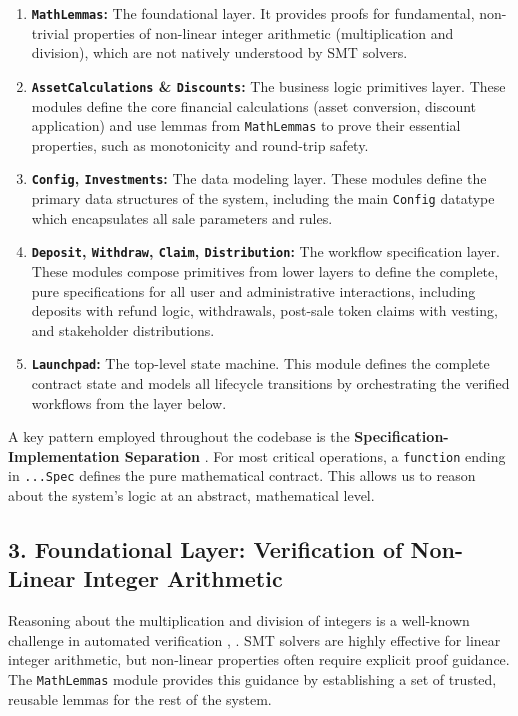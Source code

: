 \documentclass[
  english,
  onecolumn]{article}
\providecommand{\tightlist}{%
  \setlength{\itemsep}{0pt}\setlength{\parskip}{0pt}}
\begin{document}
\begin{enumerate}
\def\labelenumi{\arabic{enumi}.}
\tightlist
\item
  \textbf{\texttt{MathLemmas}:} The foundational layer. It provides
  proofs for fundamental, non-trivial properties of non-linear integer
  arithmetic (multiplication and division), which are not natively
  understood by SMT solvers.
\item
  \textbf{\texttt{AssetCalculations} \& \texttt{Discounts}:} The
  business logic primitives layer. These modules define the core
  financial calculations (asset conversion, discount application) and
  use lemmas from \texttt{MathLemmas} to prove their essential
  properties, such as monotonicity and round-trip safety.
\item
  \textbf{\texttt{Config}, \texttt{Investments}:} The data modeling
  layer. These modules define the primary data structures of the system,
  including the main \texttt{Config} datatype which encapsulates all
  sale parameters and rules.
\item
  \textbf{\texttt{Deposit}, \texttt{Withdraw}, \texttt{Claim},
  \texttt{Distribution}:} The workflow specification layer. These
  modules compose primitives from lower layers to define the complete,
  pure specifications for all user and administrative interactions,
  including deposits with refund logic, withdrawals, post-sale token
  claims with vesting, and stakeholder distributions.
\item
  \textbf{\texttt{Launchpad}:} The top-level state machine. This module
  defines the complete contract state and models all lifecycle
  transitions by orchestrating the verified workflows from the layer
  below.
\end{enumerate}

A key pattern employed throughout the codebase is the
\textbf{Specification-Implementation Separation}
. For most critical
operations, a \texttt{function} ending in \texttt{...Spec} defines the
pure mathematical contract. This allows us to reason about the system's
logic at an abstract, mathematical level.

\subsection{3. Foundational Layer: Verification of Non-Linear Integer
Arithmetic}\label{foundational-layer-verification-of-non-linear-integer-arithmetic}

Reasoning about the multiplication and division of integers is a
well-known challenge in automated verification
,
. SMT solvers are highly
effective for linear integer arithmetic, but non-linear properties often
require explicit proof guidance. The \texttt{MathLemmas} module provides
this guidance by establishing a set of trusted, reusable lemmas for the
rest of the system.
\end{document}
